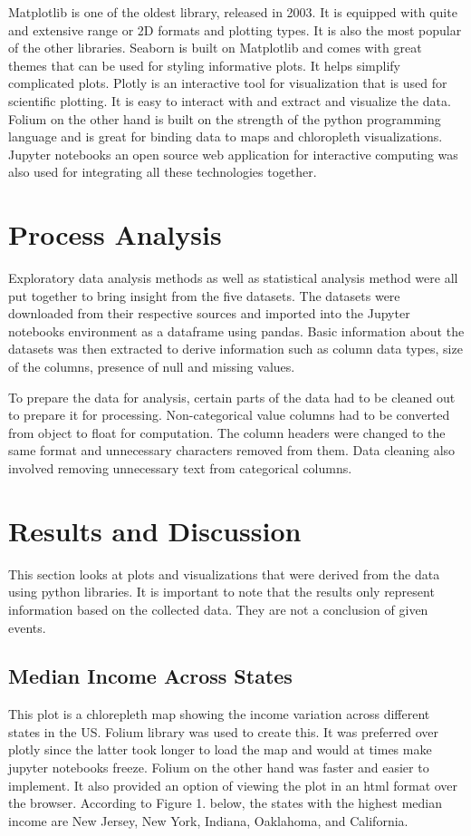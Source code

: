 \documentclass[a4paper,12pt]{article}
\begin{document}
Matplotlib is one of the oldest library, released in 2003. It is equipped with quite and extensive range or 2D formats and plotting types. It is also the most popular of the other libraries. Seaborn is built on Matplotlib and comes with great themes that can be used for styling informative plots. It helps simplify complicated plots. Plotly is an interactive tool for visualization that is used for scientific plotting. It is easy to interact with and extract and visualize the data. Folium\cite{folium} on the other hand is built on the strength of the python programming language and is great for binding data to maps and chloropleth visualizations. Jupyter notebooks an open source web application for interactive computing was also used for integrating all these technologies together.

\section{Process Analysis}
Exploratory data analysis methods as well as statistical analysis method were all put together to bring insight from the five datasets. The datasets were downloaded from their respective sources and imported into the Jupyter notebooks environment as a dataframe using pandas. Basic information about the datasets was then extracted to derive information such as column data types, size of the columns, presence of null and missing values.

To prepare the data for analysis, certain parts of the data had to be cleaned out to prepare it for processing. Non-categorical value columns had to be converted from object to float for computation. The column headers were changed to the same format and unnecessary characters removed from them. Data cleaning also involved removing unnecessary text from categorical columns. 

\section{Results and Discussion}
This section looks at plots and visualizations that were derived from the data using python libraries. It is important to note that the results only represent information based on the collected data. They are not a conclusion of given events. 
\subsection{Median Income Across States}
This plot is a chlorepleth map showing the income variation across different states in the US. Folium library was used to create this. It was preferred over plotly since the latter took longer to load the map and would at times make jupyter notebooks freeze. Folium on the other hand was faster and easier to implement. It also provided an option of viewing the plot in an html format over the browser. According to Figure 1. below, the states with the highest median income are New Jersey, New York, Indiana, Oaklahoma, and California.
\end{document}

